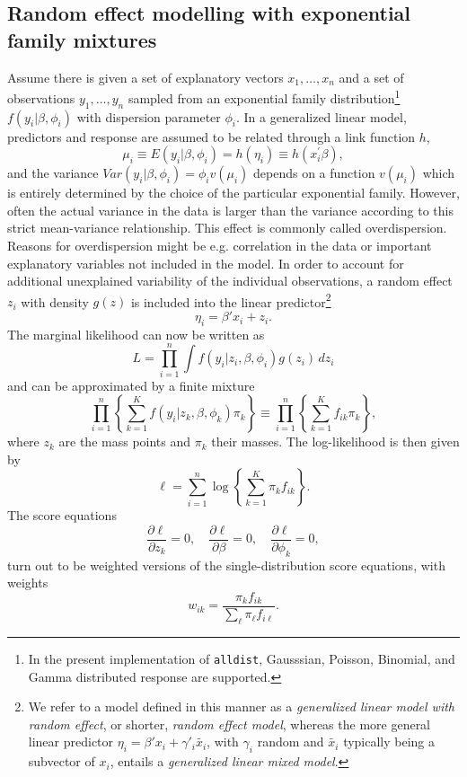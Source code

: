 \documentclass[a4paper]{article}
\begin{document}
\begin{landscape}
\section{Random effect modelling with exponential family mixtures}\label{method}


Assume there is given a set of explanatory vectors $x_1, \ldots,
x_n$ and a set of observations  $y_1,\ldots,y_n$ sampled from an
exponential family distribution\footnote{In the present
implementation of {\tt alldist}, Gausssian, Poisson, Binomial, and Gamma
distributed response are supported.}  $f(y_i|\beta,\phi_i)$ with dispersion
parameter $\phi_i$.  In a generalized linear model, predictors and
response are assumed to be related through a link function $h$,
\[
\mu_i\equiv E(y_i|\beta,\phi_i)= h(\eta_i)\equiv h(x_i^{\prime}\beta),
\]
and the variance $Var(y_i|\beta,\phi_i)= \phi_i v(\mu_i)$ depends on a
function $v(\mu_i)$ which is entirely determined by the choice of
the particular exponential family. However, often the actual
variance in the data is larger than the variance according to this
strict mean-variance relationship. This effect is commonly called
overdispersion. Reasons for overdispersion might be e.g.
correlation in the data or important explanatory variables not
included in the model. In order to account for additional
unexplained  variability of the individual observations,
 a random effect $z_i$ with density $g(z)$ is
included  into the linear predictor\footnote{We refer to a model 
defined in this manner as a {\it generalized linear model with random effect}, or shorter, 
{\it random effect model},  whereas the  more general linear predictor
 $\eta_i=\beta'x_i+\gamma'_i\tilde{x_i}$, with $\gamma_i$ random and $\tilde{x_i}$ 
 typically being a subvector of $x_i$,
entails a {\it generalized linear mixed model}.} 
\[
\eta_i=\beta'x_i+z_i.
\]
The marginal likelihood can now be
written as
\begin{equation}
\label{marginal}
L=\prod_{i=1}^n\int f(y_i|z_i,\beta,\phi_i)g(z_i)\,dz_i
\end{equation}
and can be approximated by a finite mixture
\[
\prod_{i=1}^n\left\{\sum_{k=1}^Kf(y_i|z_k,\beta,\phi_k)\pi_k\right\} \equiv \prod_{i=1}^n\left\{\sum_{k=1}^Kf_{ik}\pi_k\right\},
\]
where $z_k$ are the mass points and $\pi_k$ their masses. The log-likelihood is then given by
\begin{equation}
\label{ell} \ell=
\sum_{i=1}^n\log\left\{\sum_{k=1}^K\pi_kf_{ik}\right\}.
\end{equation}
The score equations
\begin{equation}
\label{score} \frac{\partial \ell}{\partial z_k}=0,\quad \frac{\partial
\ell}{\partial \beta}=0, \quad\frac{\partial \ell}{\partial
\phi_k}=0,
\end{equation}
turn out to be weighted versions of the single-distribution score
equations, with weights
  \begin{equation}
  \label{weights}
  w_{ik}=\frac{\pi_kf_{ik}}{\sum_{\ell}\pi_{\ell}f_{i\ell}}.
  \end{equation}


\end{landscape}
\end{document}
